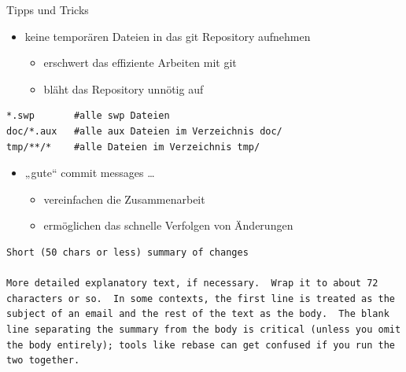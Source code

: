 \begin{frame}{Tipps und Tricks}
  \begin{itemize}
    \item keine temporären Dateien in das git Repository aufnehmen
    \begin{itemize}
      \item erschwert das effiziente Arbeiten mit git
      \item bläht das Repository unnötig auf
    \end{itemize}
  \end{itemize}
  \begin{lstlisting}[frame=single, caption=Inhalt der Datei .gitignore]
*.swp       #alle swp Dateien
doc/*.aux   #alle aux Dateien im Verzeichnis doc/
tmp/**/*    #alle Dateien im Verzeichnis tmp/
  \end{lstlisting}
  \framebreak

  \begin{itemize}
    \item „gute“ commit messages \ldots
    \begin{itemize}
      \item vereinfachen die Zusammenarbeit
      \item ermöglichen das schnelle Verfolgen von Änderungen
    \end{itemize}
  \end{itemize}
  \begin{lstlisting}[frame=single,caption={Quelle: \url{http://tbaggery.com/2008/04/19/a-note-about-git-commit-messages.html}}]
Short (50 chars or less) summary of changes

More detailed explanatory text, if necessary.  Wrap it to about 72
characters or so.  In some contexts, the first line is treated as the
subject of an email and the rest of the text as the body.  The blank
line separating the summary from the body is critical (unless you omit
the body entirely); tools like rebase can get confused if you run the
two together.
  \end{lstlisting}
  \framebreak


\end{frame}
